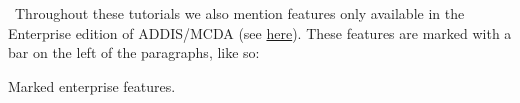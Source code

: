 \documentclass[12pt]{article}
\begin{document}
\maketitle


\tableofcontents

\vspace{1em}
\noindent \faLightbulbO \, Throughout these tutorials we also mention features only available in the Enterprise edition of ADDIS/MCDA (see \href{http://drugis.org/services/index}{here}). These features are marked with a bar on the left of the paragraphs, like so:

\begin{sidebar*}
Marked enterprise features.
\end{sidebar*}


\clearpage


\clearpage


\clearpage


\clearpage


\clearpage


\end{document}
